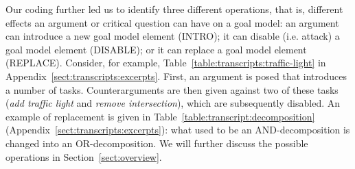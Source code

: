 Our coding further led us to identify three different operations, that is, different effects an argument or critical question can have on a goal model: an argument can introduce a new goal model element (\textsf{INTRO}); it can disable (i.e. attack) a goal model element (\textsf{DISABLE}); or it can replace a goal model element (\textsf{REPLACE}). Consider, for example, Table~\ref{table:transcripts:traffic-light} in Appendix~\ref{sect:transcripts:excerpts}. First, an argument is posed that introduces a number of tasks. Counterarguments are then given against two of these tasks (\emph{add traffic light} and \emph{remove intersection}), which are subsequently disabled. An example of replacement is given in Table~\ref{table:transcript:decomposition} (Appendix~\ref{sect:transcripts:excerpts}): what used to be an AND-decomposition is changed into an OR-decomposition. We will further discuss the possible operations in Section~\ref{sect:overview}.





